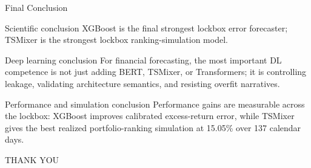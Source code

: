 \documentclass[aspectratio=169]{beamer}
\begin{document}
\begin{frame}{Final Conclusion}
\begin{block}{Scientific conclusion}
XGBoost is the final strongest lockbox error forecaster; TSMixer is the strongest lockbox ranking-simulation model.
\end{block}
\begin{block}{Deep learning conclusion}
For financial forecasting, the most important DL competence is not just adding BERT, TSMixer, or Transformers; it is controlling leakage, validating architecture semantics, and resisting overfit narratives.
\end{block}
\begin{block}{Performance and simulation conclusion}
Performance gains are measurable across the lockbox: XGBoost improves calibrated excess-return error, while TSMixer gives the best realized portfolio-ranking simulation at 15.05\% over 137 calendar days.
\end{block}
\end{frame}

\begin{frame}
  \centering
  \vspace{2.2em}
  {\LARGE THANK YOU}
\end{frame}
\end{document}
